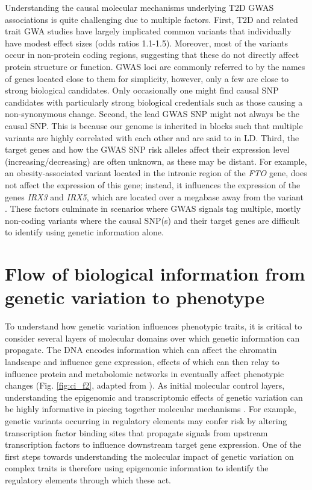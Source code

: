 Understanding the causal molecular mechanisms underlying T2D GWAS associations is quite challenging due to multiple factors. First, T2D and related trait GWA studies have largely implicated common variants that individually have modest effect sizes (odds ratios 1.1-1.5). Moreover, most of the variants occur in non-protein coding regions, suggesting that these do not directly affect protein structure or function. GWAS loci are commonly referred to by the names of genes located close to them for simplicity, however, only a few are close to strong biological candidates. Only occasionally one might find causal SNP candidates with particularly strong biological credentials such as those causing a non-synonymous change.  Second, the lead GWAS SNP might not always be the causal SNP. This is because our genome is inherited in blocks such that multiple variants are highly correlated with each other and are said to in \ac{LD}. Third, the target genes and how the GWAS SNP risk alleles affect their expression level (increasing/decreasing) are often unknown, as these may be distant. For example, an obesity-associated variant located in the intronic region of the \textit{FTO} gene, does not affect the expression of this gene; instead, it influences the expression of the genes \textit{IRX3} and \textit{IRX5}, which are located over a megabase away from the variant \cite{claussnitzerFTOObesityVariant2015}. These factors culminate in scenarios where GWAS signals tag multiple, mostly non-coding variants where the causal SNP(s) and their target genes are difficult to identify using genetic information alone.    
                                                                             
\section{Flow of biological information from genetic variation to phenotype} 
To understand how genetic variation influences phenotypic traits, it is critical to consider several layers of molecular domains over which genetic information can propagate. The DNA encodes information which can affect the chromatin landscape and influence gene expression, effects of which can then relay to influence protein and metabolomic networks in eventually affect phenotypic changes (Fig. \ref{fig:ci_f2}, adapted from \cite{civelekSystemsGeneticsApproaches2014}). As initial molecular control layers, understanding the epigenomic and transcriptomic effects of genetic variation can be highly informative in piecing together molecular mechanisms \cite{kyonoGenomicAnnotationDiseaseassociated2019}. For example, genetic variants occurring in regulatory elements may confer risk by altering transcription factor binding sites that propagate signals from upstream transcription factors to influence downstream target gene expression. One of the first steps towards understanding the molecular impact of genetic variation on complex traits is therefore using epigenomic information to identify the regulatory elements through which these act. 


